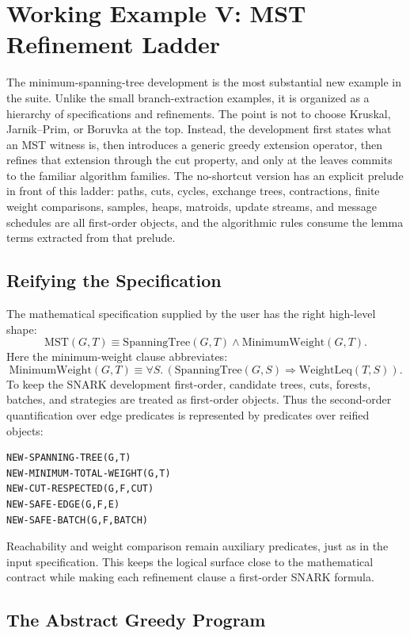 \documentclass[runningheads]{llncs}
\begin{document}
\section{Working Example V: MST Refinement Ladder}

The minimum-spanning-tree development is the most substantial new example in
the suite.  Unlike the small branch-extraction examples, it is organized as a
hierarchy of specifications and refinements.  The point is not to choose
Kruskal, Jarnik--Prim, or Boruvka
\cite{Kruskal1956,Jarnik1930,Prim1957,Boruvka1926} at the top.  Instead, the
development first states what an MST witness is, then introduces a generic
greedy extension operator, then refines that extension through the cut
property, and only at the leaves commits to the familiar algorithm families.
The no-shortcut version has an explicit prelude in front of this ladder:
paths, cuts, cycles, exchange trees, contractions, finite weight comparisons,
samples, heaps, matroids, update streams, and message schedules are all
first-order objects, and the algorithmic rules consume the lemma terms
extracted from that prelude.

\subsection{Reifying the Specification}

The mathematical specification supplied by the user has the right high-level
shape:
\[
  \mathrm{MST}(G,T) \equiv
  \mathrm{SpanningTree}(G,T)\land
  \mathrm{MinimumWeight}(G,T).
\]
Here the minimum-weight clause abbreviates:
\[
  \mathrm{MinimumWeight}(G,T) \equiv
  \forall S.\,(\mathrm{SpanningTree}(G,S)\Rightarrow
  \mathrm{WeightLeq}(T,S)).
\]
To keep the SNARK development first-order, candidate trees, cuts, forests,
batches, and strategies are treated as first-order objects.  Thus the
second-order quantification over edge predicates is represented by predicates
over reified objects:
\begin{lstlisting}
NEW-SPANNING-TREE(G,T)
NEW-MINIMUM-TOTAL-WEIGHT(G,T)
NEW-CUT-RESPECTED(G,F,CUT)
NEW-SAFE-EDGE(G,F,E)
NEW-SAFE-BATCH(G,F,BATCH)
\end{lstlisting}
Reachability and weight comparison remain auxiliary predicates, just as in the
input specification.  This keeps the logical surface close to the mathematical
contract while making each refinement clause a first-order SNARK formula.

\subsection{The Abstract Greedy Program}
\end{document}
